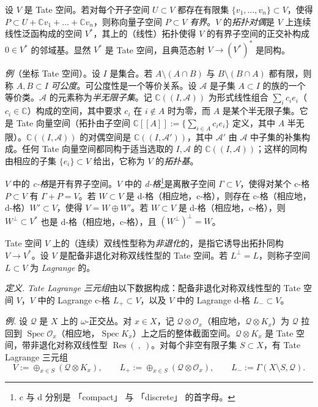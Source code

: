 设 $V$ 是 Tate 空间。若对每个开子空间 $U\subset V$ 都存在有限集 $\{v_{1},\dots,v_{n}\}\subset V$，使得 $P\subset U+\mathbb{C}v_{1}+\dots+\mathbb{C}v_{n}$，则称向量子空间 $P\subset V$ \emph{有界}。$V$ 的\emph{拓扑对偶}是 $V$ 上连续线性泛函构成的空间 $V^{*}$，其上的（线性）拓扑使得 $V$ 的有界子空间的正交补构成 $0\in V^{*}$ 的邻域基。显然 $V^{*}$ 是 Tate 空间，且典范态射 $V\to(V^{*})^{*}$ 是同构。

\emph{例}（坐标 Tate 空间）。设 $I$ 是集合。若 $A\setminus(A\cap B)$ 与 $B\setminus(B\cap A)$ 都有限，则称 $A,B\subset I$ \emph{可公度}。可公度性是一个等价关系。设 $\mathcal{A}$ 是子集 $A\subset I$ 的族的一个等价类。$\mathcal{A}$ 的元素称为\emph{半无限子集}。记 $\mathbb{C}((I,\mathcal{A}))$ 为形式线性组合 $\sum_{i}c_{i}e_{i}$（$c_{i}\in\mathbb{C}$）构成的空间，其中要求 $c_{i}$ 在 $i\notin A$ 时为零，而 $A$ 是某个半无限子集。它是 Tate 向量空间（拓扑由子空间 $\mathbb{C}[[A]]:=\{\sum_{i\in A}c_{i}e_{i}\}$ 定义，其中 $A$ 半无限）。$\mathbb{C}((I,\mathcal{A}))$ 的对偶空间是 $\mathbb{C}((I,\mathcal{A}'))$，其中 $\mathcal{A}'$ 由 $\mathcal{A}$ 中子集的补集构成。任何 Tate 向量空间都同构于适当选取的 $I,\mathcal{A}$ 的 $\mathbb{C}((I,\mathcal{A}))$；这样的同构由相应的子集 $\{e_{i}\}\subset V$ 给出，它称为 $V$ 的\emph{拓扑基}。

$V$ 中的 \emph{c-格}是开有界子空间。$V$ 中的 \emph{d-格}\footnote{c 与 d 分别是 「compact」 与 「discrete」 的首字母。}是离散子空间 $\Gamma\subset V$，使得对某个 c-格 $P\subset V$ 有 $\Gamma+P=V$。若 $W\subset V$ 是 d-格（相应地，c-格），则存在 c-格（相应地，d-格）$W'\subset V$，使得 $V=W\oplus W'$。若 $W\subset V$ 是 d-格（相应地，c-格），则 $W^{\perp}\subset V^{*}$ 也是 d-格（相应地，c-格），且 $(W^{\perp})^{\perp}=W$。

Tate 空间 $V$ 上的（连续）双线性型称为\emph{非退化}的，是指它诱导出拓扑同构 $V\to V^{*}$。设 $V$ 是配备非退化对称双线性型的 Tate 空间。若 $L^{\perp}=L$，则称子空间 $L\subset V$ 为 \emph{Lagrange} 的。

\emph{定义.} \emph{Tate Lagrange 三元组}由以下数据构成：配备非退化对称双线性型的 Tate 空间 $V$，$V$ 中的 Lagrange c-格 $L_{+}\subset V$，以及 $V$ 中的 Lagrange d-格 $L_{-}\subset V$。

\emph{例.} 设 $\mathcal{Q}$ 是 $X$ 上的 $\omega$-正交丛。对 $x\in X$，记 $\mathcal{Q}\otimes\mathcal{O}_{x}$（相应地，$\mathcal{Q}\otimes K_{x}$）为 $\mathcal{Q}$ 拉回到 $\operatorname{Spec}\mathcal{O}_{x}$（相应地，$\operatorname{Spec}K_{x}$）上之后的整体截面空间。$\mathcal{Q}\otimes K_{x}$ 是 Tate 空间，带非退化对称双线性型 $\operatorname{Res}(\ ,\ )$。对每个非空有限子集 $S\subset X$，有 Tate Lagrange 三元组
\begin{equation}\tag{181}
V:=\oplus_{x\in S}(\mathcal{Q}\otimes K_{x}),\qquad L_{+}:=\oplus_{x\in S}(\mathcal{Q}\otimes\mathcal{O}_{x}),\qquad L_{-}:=\Gamma(X\setminus S,\mathcal{Q}).
\end{equation}

